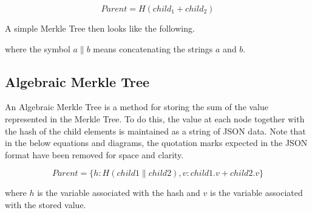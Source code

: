 \documentclass[a4paper,12pt]{article}
\newcommand{\concatenate}{\mathbin{\|}}
\begin{document}
\[ Parent = H(child_1 + child_2) \]

A simple Merkle Tree then looks like the following. 


where the symbol $a \concatenate b$ means concatenating the strings $a$ and $b$. 



\subsection{Algebraic Merkle Tree}\label{algebraicMerkleTree}
An Algebraic Merkle Tree is a method for storing the sum of the value represented in the Merkle Tree. To do this, the value at each node together with the hash of the child elements is maintained as a string of JSON data. Note that in the below equations and diagrams, the quotation marks expected in the JSON format have been removed for space and clarity.

\[ Parent = \{h: H(child1 \concatenate child2),
v: child1.v+child2.v\} \]

where $h$ is the variable associated with the hash and $v$ is the variable 
associated with the stored value.

\end{document}
